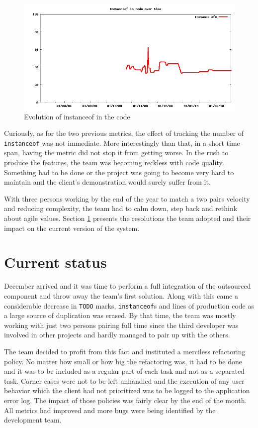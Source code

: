 \documentclass[lnbip]{svmultln}
\begin{document}
\begin{figure}[hbt]
  \centerline{
    \includegraphics[width=120mm]{InstanceOfs.png}
  }
  \caption{Evolution of instanceof in the code }
  \label{fig:InstanceOfs}
\end{figure}

Curiously, as for the two previous metrics, the effect of tracking the
number of \texttt{instanceof} was not immediate. More interestingly
than that, in a short time span, having the metric did not stop it
from getting worse. In the rush to produce the features, the team was
becoming reckless with code quality.  Something had to be done or the
project was going to become very hard to maintain and the client's
demonstration would surely suffer from it.

With three persons working by the end of the year to match a two pairs
velocity and reducing complexity, the team had to calm down, step back
and rethink about agile values. Section \ref{sec:nowadays} presents
the resolutions the team adopted and their impact on the current
version of the system.

\section{Current status}
\label{sec:nowadays}

December arrived and it was time to perform a full integration of the
outsourced component and throw away the team's first
solution. Along with this came a considerable decrease in \texttt{TODO}
marks, \texttt{instanceof}s and lines of production code as a
large source of duplication was erased. By that time, the team was
mostly working with just two persons pairing full time since the
third developer was involved in other projects and hardly managed to
pair up with the others.

The team decided to profit from this fact and
instituted a merciless refactoring policy. No matter how small or how
big the refactoring was, it had to be done and it was to be included
as a regular part of each task and not as a separated task. Corner
cases were not to be left unhandled and the execution of any user
behavior which the client had not prioritized was to be logged 
to the application error log. The impact of those
policies was fairly clear by the end of the month. All metrics had
improved and more bugs were being identified by the development team.
\end{document}
